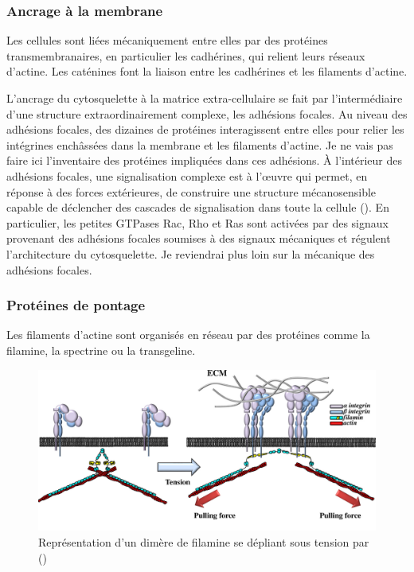 \documentclass{report}
\begin{document}
\subsubsection{Ancrage à la membrane}

Les cellules sont liées mécaniquement entre elles par des protéines transmembranaires, en particulier les cadhérines, qui relient leurs réseaux d'actine. Les caténines font la liaison entre les cadhérines et les filaments d'actine. 

L'ancrage du cytosquelette à la matrice extra-cellulaire se fait par l'intermédiaire d'une structure extraordinairement complexe, les adhésions focales. 
Au niveau des adhésions focales, des dizaines de protéines interagissent entre elles pour relier les intégrines enchâssées dans la membrane et les filaments d'actine. 
Je ne vais pas faire ici l'inventaire des protéines impliquées dans ces adhésions. 
À l'intérieur des adhésions focales, une signalisation complexe est à l'\oe uvre qui permet, en réponse à des forces extérieures, de construire une structure mécanosensible capable de déclencher des cascades de signalisation dans toute la cellule (\cite{geiger_environmental_2009}). 
En particulier, les petites GTPases Rac, Rho et Ras sont activées par des signaux provenant des adhésions focales soumises à des signaux mécaniques et régulent l'architecture du cytosquelette.
Je reviendrai plus loin sur la mécanique des adhésions focales.  

\subsubsection{Protéines de pontage}

Les filaments d'actine sont organisés en réseau par des protéines comme la filamine, la spectrine ou la transgeline. 

\begin{figure}
\includegraphics[scale=0.25]{Figures/filamine.png} 
\caption{Représentation d'un dimère de filamine se dépliant sous tension par (\cite{janostiak_mechanosensors_2014}) \label{filamine}}
\end{figure}
\end{document}
